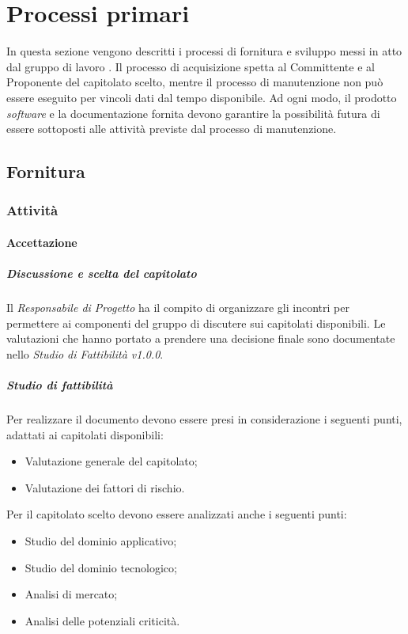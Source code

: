 \section{Processi primari}
In questa sezione vengono descritti i processi di fornitura e sviluppo messi in atto dal gruppo di lavoro \GRUPPO. Il processo di acquisizione spetta al Committente e al Proponente del capitolato scelto, mentre il processo di manutenzione non può essere eseguito per vincoli dati dal tempo disponibile. Ad ogni modo, il prodotto \textit{software} e la documentazione fornita devono garantire la possibilità futura di essere sottoposti alle attività previste dal processo di manutenzione.
\subsection{Fornitura}
\subsubsection{Attività}
\paragraph{Accettazione}
\subparagraph{Discussione e scelta del capitolato}
Il \textit{Responsabile di Progetto} ha il compito di organizzare gli incontri per permettere ai componenti del gruppo di discutere sui capitolati disponibili.
Le valutazioni che hanno portato a prendere una decisione finale sono documentate nello \textit{Studio di Fattibilità v1.0.0}.
\subparagraph{Studio di fattibilità}
Per realizzare il documento devono essere presi in considerazione i seguenti punti, adattati ai capitolati disponibili:
\begin{itemize}
\item{Valutazione generale del capitolato;}
\item{Valutazione dei fattori di rischio.}
\end{itemize}

Per il capitolato scelto devono essere analizzati anche i seguenti punti:
\begin{itemize}
	\item{Studio del dominio applicativo;}
	\item{Studio del dominio tecnologico;}
	\item{Analisi di mercato;}
	\item{Analisi delle potenziali criticità.}
\end{itemize}

